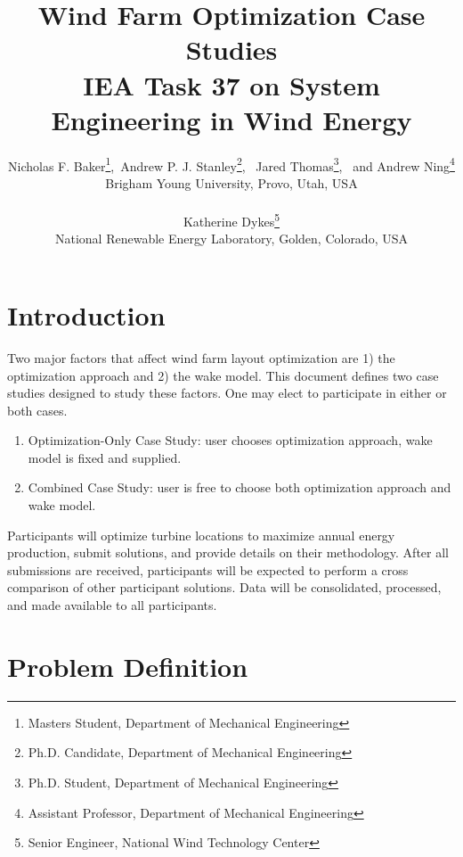 \documentclass{article}
\begin{document}
\title{Wind Farm Optimization Case Studies
\\
\small{IEA Task 37 on System Engineering in Wind Energy}
}
\author{\small Nicholas F. Baker\thanks{Masters Student, Department of Mechanical Engineering},\  Andrew P. J. Stanley\thanks{Ph.D. Candidate, Department of Mechanical Engineering}, \ Jared Thomas\thanks{Ph.D. Student, Department of Mechanical Engineering}, \ and Andrew Ning\thanks{Assistant Professor, Department of Mechanical Engineering} \\
    {\small Brigham Young University, Provo, Utah, USA}\\
\vspace{-1em}\\
\small Katherine Dykes\thanks{Senior Engineer, National Wind Technology Center}\\
    \small National Renewable Energy Laboratory, Golden, Colorado, USA}
\maketitle

\section{Introduction}

Two major factors that affect wind farm layout optimization are 1) the optimization approach and 2) the wake model. This document defines two case studies designed to study these factors. One may elect to participate in either or both cases.
\begin{enumerate}
    \item Optimization-Only Case Study: user chooses optimization approach, wake model is fixed and supplied.
    \item Combined Case Study: user is free to choose both optimization approach and wake model.
\end{enumerate}

Participants will optimize turbine locations to maximize annual energy production, submit solutions, and provide details on their methodology.  After all submissions are received, participants will be expected to perform a cross comparison of other participant solutions.  Data will be consolidated, processed, and made available to all participants.

\section{Problem Definition}
\end{document}
